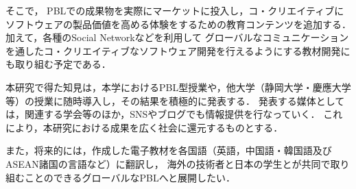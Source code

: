 \documentclass[a4j,9pt,twoside,twocolumn]{jsarticle}
\begin{document}
	そこで，
	PBLでの成果物を実際にマーケットに投入し，コ・クリエイティブにソフトウェアの製品価値を高める体験をするための教育コンテンツを追加する．
	加えて，各種のSocial Networkなどを利用して
	グローバルなコミュニケーションを通したコ・クリエイティブなソフトウェア開発を行えるようにする教材開発にも取り組む予定である．

	本研究で得た知見は，本学におけるPBL型授業や，他大学（静岡大学・慶應大学等）の授業に随時導入し，その結果を積極的に発表する．
	発表する媒体としては，関連する学会等のほか，SNSやブログでも情報提供を行なっていく．
	これにより，本研究における成果を広く社会に還元するものとする．
	
	また，将来的には，作成した電子教材を各国語（英語，中国語・韓国語及びASEAN諸国の言語など）に翻訳し，
	海外の技術者と日本の学生とが共同で取り組むことのできるグローバルなPBLへと展開したい．
	
\end{document}
